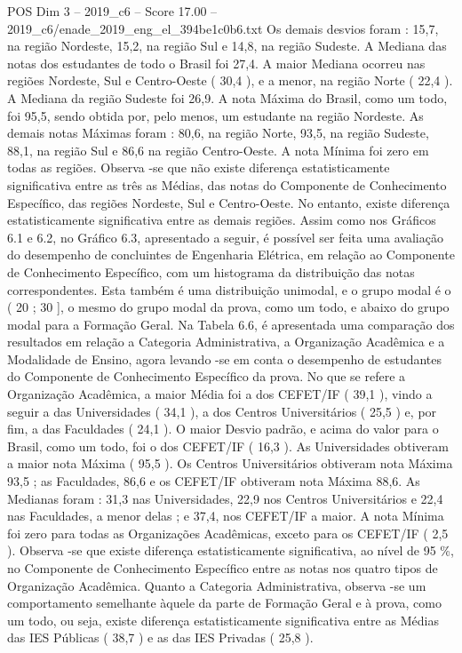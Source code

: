 \begin{textsample}{POS Dim 3 – 2019\_c6 – Score 17.00 – 2019\_c6/enade\_2019\_eng\_el\_394be1c0b6.txt}
Os demais desvios foram : 15,7, na região Nordeste, 15,2, na região Sul e 14,8, na região Sudeste.
A Mediana das notas dos estudantes de todo o Brasil foi 27,4.
A maior Mediana ocorreu nas regiões Nordeste, Sul e Centro-Oeste ( 30,4 ), e a menor, na região Norte ( 22,4 ).
A Mediana da região Sudeste foi 26,9.
A nota Máxima do Brasil, como um todo, foi 95,5, sendo obtida por, pelo menos, um estudante na região Nordeste.
As demais notas Máximas foram : 80,6, na região Norte, 93,5, na região Sudeste, 88,1, na região Sul e 86,6 na região Centro-Oeste.
A nota Mínima foi zero em todas as regiões.
Observa -se que não existe diferença estatisticamente significativa entre as três as Médias, das notas do Componente de Conhecimento Específico, das regiões Nordeste, Sul e Centro-Oeste.
No entanto, existe diferença estatisticamente significativa entre as demais regiões.
Assim como nos Gráficos 6.1 e 6.2, no Gráfico 6.3, apresentado a seguir, é possível ser feita uma avaliação do desempenho de concluintes de Engenharia Elétrica, em relação ao Componente de Conhecimento Específico, com um histograma da distribuição das notas correspondentes.
Esta também é uma distribuição unimodal, e o grupo modal é o ( 20 ; 30 ], o mesmo do grupo modal da prova, como um todo, e abaixo do grupo modal para a Formação Geral.
Na Tabela 6.6, é apresentada uma comparação dos resultados em relação a Categoria Administrativa, a Organização Acadêmica e a Modalidade de Ensino, agora levando -se em conta o desempenho de estudantes do Componente de Conhecimento Específico da prova.
No que se refere a Organização Acadêmica, a maior Média foi a dos CEFET/IF ( 39,1 ), vindo a seguir a das Universidades ( 34,1 ), a dos Centros Universitários ( 25,5 ) e, por fim, a das Faculdades ( 24,1 ).
O maior Desvio padrão, e acima do valor para o Brasil, como um todo, foi o dos CEFET/IF ( 16,3 ).
As Universidades obtiveram a maior nota Máxima ( 95,5 ).
Os Centros Universitários obtiveram nota Máxima 93,5 ; as Faculdades, 86,6 e os CEFET/IF obtiveram nota Máxima 88,6.
As Medianas foram : 31,3 nas Universidades, 22,9 nos Centros Universitários e 22,4 nas Faculdades, a menor delas ; e 37,4, nos CEFET/IF a maior.
A nota Mínima foi zero para todas as Organizações Acadêmicas, exceto para os CEFET/IF ( 2,5 ).
Observa -se que existe diferença estatisticamente significativa, ao nível de 95 \%, no Componente de Conhecimento Específico entre as notas nos quatro tipos de Organização Acadêmica.
Quanto a Categoria Administrativa, observa -se um comportamento semelhante àquele da parte de Formação Geral e à prova, como um todo, ou seja, existe diferença estatisticamente significativa entre as Médias das IES Públicas ( 38,7 ) e as das IES Privadas ( 25,8 ).

\end{textsample}
